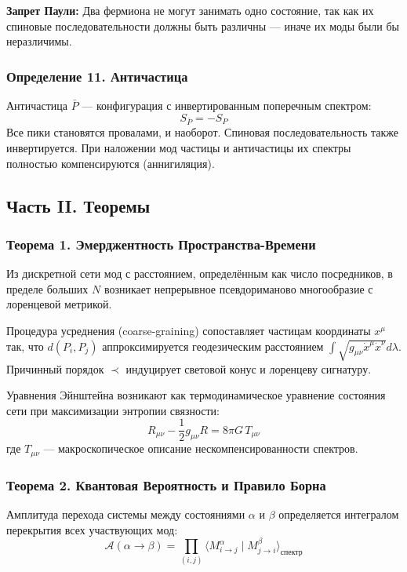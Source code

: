 \documentclass[12pt,a4paper]{article}
\begin{document}
\textbf{Запрет Паули:} Два фермиона не могут занимать одно состояние, так как их спиновые последовательности должны быть различны --- иначе их моды были бы неразличимы.

\subsubsection{Определение 11. Античастица}
Античастица $\bar{P}$ --- конфигурация с инвертированным поперечным спектром:
\begin{equation}
    S_{\bar{P}} = -S_P
\end{equation}
Все пики становятся провалами, и наоборот. Спиновая последовательность также инвертируется. При наложении мод частицы и античастицы их спектры полностью компенсируются (аннигиляция).

\subsection{Часть II. Теоремы}

\subsubsection{Теорема 1. Эмерджентность Пространства-Времени}
Из дискретной сети мод с расстоянием, определённым как число посредников, в пределе больших $N$ возникает непрерывное псевдориманово многообразие с лоренцевой метрикой.

Процедура усреднения (coarse-graining) сопоставляет частицам координаты $x^\mu$ так, что $d(P_i, P_j)$ аппроксимируется геодезическим расстоянием $\int \sqrt{g_{\mu\nu} \dot{x}^\mu \dot{x}^\nu} d\lambda$. Причинный порядок $\prec$ индуцирует световой конус и лоренцеву сигнатуру.

Уравнения Эйнштейна возникают как термодинамическое уравнение состояния сети при максимизации энтропии связности:
\begin{equation}
    R_{\mu\nu} - \frac{1}{2} g_{\mu\nu} R = 8\pi G \, T_{\mu\nu}
\end{equation}
где $T_{\mu\nu}$ --- макроскопическое описание нескомпенсированности спектров.

\subsubsection{Теорема 2. Квантовая Вероятность и Правило Борна}
Амплитуда перехода системы между состояниями $\alpha$ и $\beta$ определяется интегралом перекрытия всех участвующих мод:
\begin{equation}
    \mathcal{A}(\alpha \to \beta) = \prod_{(i,j)} \langle M_{i \to j}^\alpha \mid M_{j \to i}^\beta \rangle_{\text{спектр}}
\end{equation}
\end{document}
